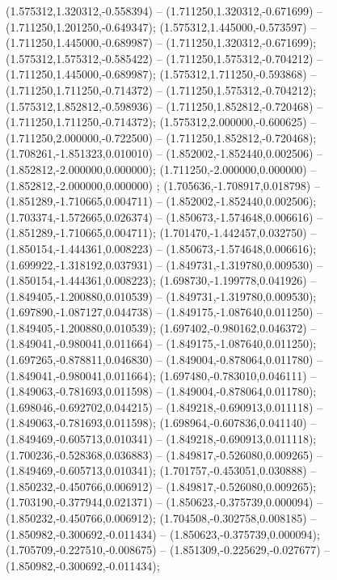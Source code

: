  (1.575312,1.320312,-0.558394) -- (1.711250,1.320312,-0.671699) -- (1.711250,1.201250,-0.649347);
 (1.575312,1.445000,-0.573597) -- (1.711250,1.445000,-0.689987) -- (1.711250,1.320312,-0.671699);
 (1.575312,1.575312,-0.585422) -- (1.711250,1.575312,-0.704212) -- (1.711250,1.445000,-0.689987);
 (1.575312,1.711250,-0.593868) -- (1.711250,1.711250,-0.714372) -- (1.711250,1.575312,-0.704212);
 (1.575312,1.852812,-0.598936) -- (1.711250,1.852812,-0.720468) -- (1.711250,1.711250,-0.714372);
 (1.575312,2.000000,-0.600625) -- (1.711250,2.000000,-0.722500) -- (1.711250,1.852812,-0.720468);
 (1.708261,-1.851323,0.010010) -- (1.852002,-1.852440,0.002506) -- (1.852812,-2.000000,0.000000);
 (1.711250,-2.000000,0.000000) -- (1.852812,-2.000000,0.000000) ;
 (1.705636,-1.708917,0.018798) -- (1.851289,-1.710665,0.004711) -- (1.852002,-1.852440,0.002506);
 (1.703374,-1.572665,0.026374) -- (1.850673,-1.574648,0.006616) -- (1.851289,-1.710665,0.004711);
 (1.701470,-1.442457,0.032750) -- (1.850154,-1.444361,0.008223) -- (1.850673,-1.574648,0.006616);
 (1.699922,-1.318192,0.037931) -- (1.849731,-1.319780,0.009530) -- (1.850154,-1.444361,0.008223);
 (1.698730,-1.199778,0.041926) -- (1.849405,-1.200880,0.010539) -- (1.849731,-1.319780,0.009530);
 (1.697890,-1.087127,0.044738) -- (1.849175,-1.087640,0.011250) -- (1.849405,-1.200880,0.010539);
 (1.697402,-0.980162,0.046372) -- (1.849041,-0.980041,0.011664) -- (1.849175,-1.087640,0.011250);
 (1.697265,-0.878811,0.046830) -- (1.849004,-0.878064,0.011780) -- (1.849041,-0.980041,0.011664);
 (1.697480,-0.783010,0.046111) -- (1.849063,-0.781693,0.011598) -- (1.849004,-0.878064,0.011780);
 (1.698046,-0.692702,0.044215) -- (1.849218,-0.690913,0.011118) -- (1.849063,-0.781693,0.011598);
 (1.698964,-0.607836,0.041140) -- (1.849469,-0.605713,0.010341) -- (1.849218,-0.690913,0.011118);
 (1.700236,-0.528368,0.036883) -- (1.849817,-0.526080,0.009265) -- (1.849469,-0.605713,0.010341);
 (1.701757,-0.453051,0.030888) -- (1.850232,-0.450766,0.006912) -- (1.849817,-0.526080,0.009265);
 (1.703190,-0.377944,0.021371) -- (1.850623,-0.375739,0.000094) -- (1.850232,-0.450766,0.006912);
 (1.704508,-0.302758,0.008185) -- (1.850982,-0.300692,-0.011434) -- (1.850623,-0.375739,0.000094);
 (1.705709,-0.227510,-0.008675) -- (1.851309,-0.225629,-0.027677) -- (1.850982,-0.300692,-0.011434);
